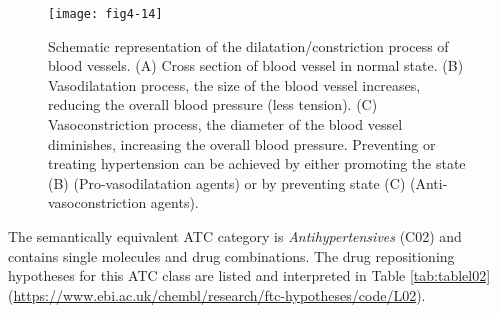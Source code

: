 \begin{figure}[ht]
    \centering
    \texttt{[image: fig4-14]}
    \caption{Schematic representation of the dilatation/constriction process of blood vessels. (A) Cross section of blood vessel in normal state. (B) Vasodilatation process, the size of the blood vessel increases, reducing the overall blood pressure (less tension). (C) Vasoconstriction process, the diameter of the blood vessel diminishes, increasing the overall blood pressure. Preventing or treating hypertension can be achieved by either promoting the state (B) (Pro-vasodilatation agents) or by preventing state (C) (Anti-vasoconstriction agents).}
    \label{fig4-14}
\end{figure}

The semantically equivalent ATC category is \emph{Antihypertensives} (C02) and contains single molecules and drug combinations. The drug repositioning hypotheses for this ATC class are listed and interpreted in Table \ref{tab:tablel02} (\url{https://www.ebi.ac.uk/chembl/research/ftc-hypotheses/code/L02}).

